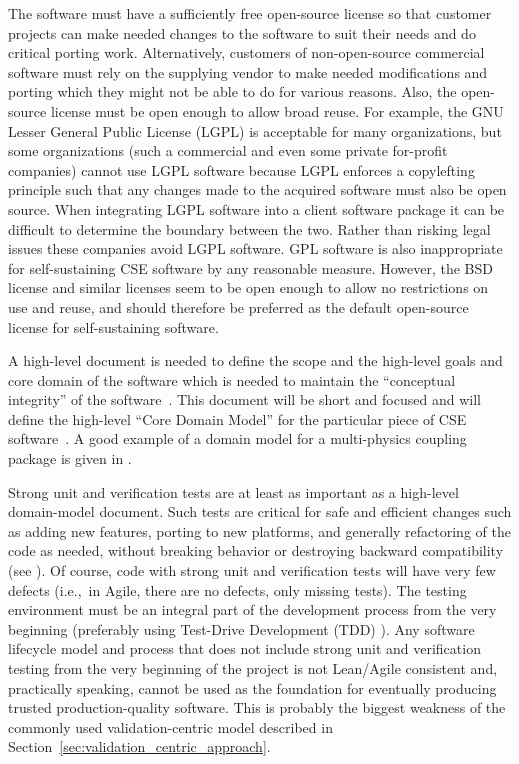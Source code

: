 \documentclass[11pt]{SANDreport}
\begin{document}
The software must have a sufficiently free open-source license so that
customer projects can make needed changes to the software to suit
their needs and do critical porting work.  Alternatively, customers of
non-open-source commercial software must rely on the supplying vendor
to make needed modifications and porting which they might not be able
to do for various reasons.  Also, the open-source license must be open
enough to allow broad reuse.  For example, the GNU Lesser General
Public License (LGPL) is acceptable for many organizations, but some
organizations (such a commercial and even some private for-profit
companies) cannot use LGPL software because LGPL enforces a
copylefting principle such that any changes made to the acquired
software must also be open source.  When integrating LGPL software
into a client software package it can be difficult to determine the
boundary between the two.  Rather than risking legal issues these
companies avoid LGPL software.  GPL software is also inappropriate for
self-sustaining CSE software by any reasonable measure.  However, the
BSD license and similar licenses seem to be open enough to allow no
restrictions on use and reuse, and should therefore be preferred as
the default open-source license for self-sustaining software.

A high-level document is needed to define the scope and the high-level
goals and core domain of the software which is needed to maintain the
``conceptual integrity'' of the software~\cite{MythicalManMonth95}.
This document will be short and focused and will define the high-level
``Core Domain Model'' for the particular piece of CSE
software~\cite{DomainDrivenDesign}.  A good example of a domain model
for a multi-physics coupling package is given in {}\cite{LIMEtheory}.

Strong unit and verification tests are at least as important as a
high-level domain-model document.  Such tests are critical for safe
and efficient changes such as adding new features, porting to new
platforms, and generally refactoring of the code as needed, without
breaking behavior or destroying backward compatibility (see
{}\cite{WorkingEffectivelyWithLegacyCode05}).  Of course, code with
strong unit and verification tests will have very few defects (i.e.,\
in Agile, there are no defects, only missing tests).  The testing
environment must be an integral part of the development process from
the very beginning (preferably using Test-Drive Development (TDD)
{}\cite{TDD}).  Any software lifecycle model and process that does not
include strong unit and verification testing from the very beginning
of the project is not Lean/Agile consistent and, practically speaking,
cannot be used as the foundation for eventually producing trusted
production-quality software.  This is probably the biggest weakness of
the commonly used validation-centric model described in
Section~\ref{sec:validation_centric_approach}.
\end{document}
